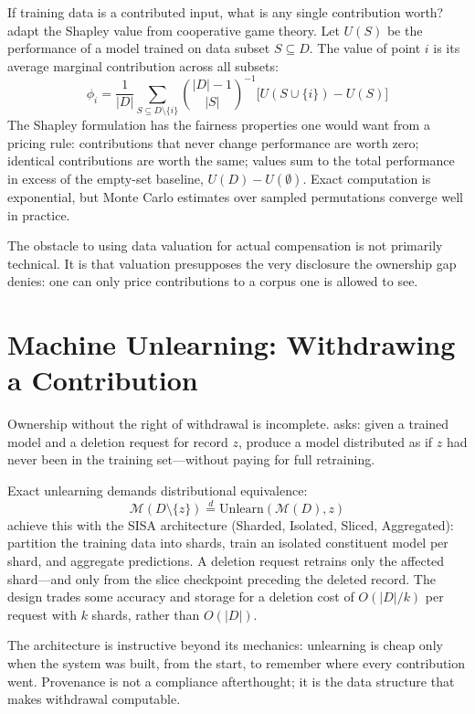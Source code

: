 If training data is a contributed input, what is any single contribution worth? \textcite{ghorbani2019data} adapt the Shapley value from cooperative game theory. Let $U(S)$ be the performance of a model trained on data subset $S \subseteq D$. The  value of point $i$ is its average marginal contribution across all subsets:
\[
\phi_i = \frac{1}{|D|} \sum_{S \subseteq D \setminus \{i\}}
  \binom{|D|-1}{|S|}^{-1} \bigl[U(S \cup \{i\}) - U(S)\bigr]
\]
The Shapley formulation has the fairness properties one would want from a pricing rule: contributions that never change performance are worth zero; identical contributions are worth the same; values sum to the total performance in excess of the empty-set baseline, $U(D) - U(\emptyset)$. Exact computation is exponential, but Monte Carlo estimates over sampled permutations converge well in practice.

The obstacle to using data valuation for actual compensation is not primarily technical. It is that valuation presupposes the very disclosure the ownership gap denies: one can only price contributions to a corpus one is allowed to see.

\section{Machine Unlearning: Withdrawing a Contribution}
\label{sec:a18-unlearning}

Ownership without the right of withdrawal is incomplete.  asks: given a trained model and a deletion request for record $z$, produce a model distributed as if $z$ had never been in the training set---without paying for full retraining.

Exact unlearning demands distributional equivalence:
\[
\mathcal{M}(D \setminus \{z\}) \stackrel{d}{=} \mathrm{Unlearn}(\mathcal{M}(D), z)
\]
\textcite{bourtoule2021machine} achieve this with the SISA architecture (Sharded, Isolated, Sliced, Aggregated): partition the training data into shards, train an isolated constituent model per shard, and aggregate predictions. A deletion request retrains only the affected shard---and only from the slice checkpoint preceding the deleted record. The design trades some accuracy and storage for a deletion cost of $O(|D|/k)$ per request with $k$ shards, rather than $O(|D|)$.

The architecture is instructive beyond its mechanics: unlearning is cheap only when the system was built, from the start, to remember where every contribution went. Provenance is not a compliance afterthought; it is the data structure that makes withdrawal computable.

